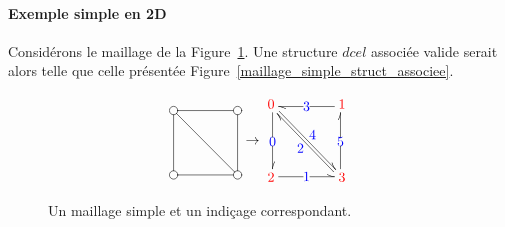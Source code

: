 \documentclass[]{article}
\begin{document}
\paragraph*{Exemple simple en 2D}
Considérons le maillage de la Figure~\ref{maillage_simple}. Une structure $dcel$ associée valide serait alors telle que celle présentée Figure~\ref{maillage_simple_struct_associee}.

\begin{figure}[H]
	\[\begin{aligned}[c]
			\entrymodifiers={+[o][F]}
			\renewcommand{\labelstyle}{\textstyle}
			\xymatrix@=4em @L=.25ex{
			{}
			\ar @^{-} [d]
			\ar @^{-} [dr]
			 & {}
			\ar @^{-} [l]
			\\ {}
			\ar @^{-} [r]
			 & {}
			\ar @^{-} [u]
			}
		\end{aligned}\rightarrow\begin{aligned}[c]
			\xymatrix@=4em @L=.25ex{
			{\color{red}0}
			\ar @<.25ex> @^{->} [d] |{\color{blue}0}
			\ar @<.25ex> @^{->} [dr] ^{\color{blue}4}
			 & {\color{red}1}
			\ar @<.25ex> @^{->} [l] |{\color{blue}3}
			\\ {\color{red}2}
			\ar @<.25ex> @^{->} [r] |{\color{blue}1}
			 & {\color{red}3}
			\ar @<.25ex> @^{->} [ul] ^{\color{blue}2}
			\ar @<.25ex> @^{->} [u] |{\color{blue}5}
			}
		\end{aligned}\]
	\caption{Un maillage simple et un indiçage correspondant.}
	\label{maillage_simple}
\end{figure}
\end{document}
